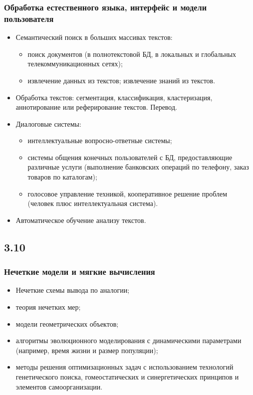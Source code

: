 \documentclass[default]{beamer}
\begin{document}
	\begin{frame}
		\frametitle{Обработка естественного языка, интерфейс и модели пользователя}
		\begin{itemize}
			\small
			\item Семантический поиск в больших массивах текстов:
			\begin{itemize}
				\footnotesize
				\item поиск документов (в полнотекстовой БД, в локальных и глобальных телекоммуникационных сетях);
				\item извлечение данных из текстов;
				извлечение знаний из текстов.
			\end{itemize}
			
			\item Обработка текстов: сегментация, классификация, кластеризация, аннотирование или реферирование текстов. Перевод. 
			\item Диалоговые системы: 
			\begin{itemize}
				\footnotesize
				\item интеллектуальные вопросно-ответные системы; 
				\item системы общения конечных пользователей с БД, предоставляющие  различные услуги (выполнение банковских операций по телефону, заказ товаров по каталогам); 
				\item голосовое управление техникой, кооперативное решение проблем (человек плюс интеллектуальная система).
			\end{itemize}
			
			\item Автоматическое обучение анализу текстов.
			
		\end{itemize}
		
	\end{frame}

	\subsection{3.10}
	\begin{frame}
		\frametitle{Нечеткие модели и мягкие вычисления}
		
		\Large 
		\begin{itemize}
			\item Нечеткие схемы вывода по аналогии;
			\item теория нечетких мер; 
			\item модели геометрических объектов;
			\item алгоритмы эволюционного моделирования с динамическими параметрами (например, время жизни и размер популяции);
			\item методы решения оптимизационных задач с использованием технологий генетического поиска, гомеостатических и синергетических принципов и элементов самоорганизации. 
		\end{itemize}
		
	\end{frame}
\end{document}
